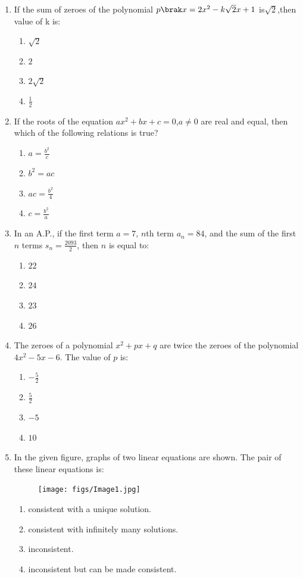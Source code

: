 
\begin{enumerate}


\item If the sum of zeroes of the polynomial $ p\brak x = 2x^2 - k\sqrt2x+1 $ is${\sqrt2} $,then value of k is:
\begin{enumerate}
    \item $ \sqrt{2} $
    \item $2$
    \item $ 2  \sqrt{2} $
    \item $ \frac{1}{2} $
 \end{enumerate}

\item If the roots of the equation $ax^2 + bx + c = 0$,$a \neq 0$ are real and equal, then which of the following relations is true?
\begin{enumerate}    
    \item $a = \frac{b^2}{c}$
    \item $b^2 = ac$                                                                                    \item $ac = \frac{b^2}{4}$
    \item $c = \frac{b^2}{a}$
\end{enumerate}

\item In an A.P., if the first term $a = 7$, $n$th term $a_{n} = 84$, and the sum of the first $n$ terms $s_{n} = \frac{2093}{2}$, then $n$ is equal to:
\begin{enumerate}
    \item $22$
    \item $24$
    \item $23$
    \item $26$
\end{enumerate}

\item The zeroes of a polynomial $x^2 + px + q$ are twice the zeroes of the polynomial $4x^2 - 5x - 6$. The value of $p$ is:
	\begin{enumerate}   
\item $-\frac{5}{2}$
    \item $\frac{5}{2}$
    \item $-5$
    \item $10$
	\end{enumerate}
\newpage
 \item In the given figure, graphs of two linear equations are shown. The pair of these linear equations is:
\begin{figure}[!ht]
\centering
\texttt{[image: figs/Image1.jpg]}
\caption{}
\label{fig:enter-label}
\end{figure}
\begin{enumerate}
    \item consistent with a unique solution.
    \item consistent with infinitely many solutions.
    \item inconsistent.
    \item inconsistent but can be made consistent.
\end{enumerate}


\end{enumerate}
